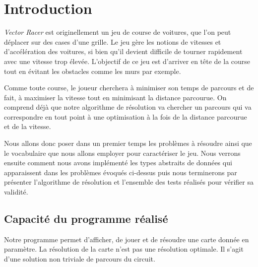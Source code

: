 \section*{Introduction}
\textit{Vector Racer} est originellement un jeu de course de voitures, que l'on peut déplacer sur des cases d'une grille. Le jeu gère les notions de vitesses et d'accélération des voitures, si bien qu'il devient difficile de tourner rapidement avec une vitesse trop élevée. L'objectif de ce jeu est d'arriver en tête de la course tout en évitant les obstacles comme les murs par exemple.

Comme toute course, le joueur cherchera à minimiser son temps de parcours et de fait, à maximiser la vitesse tout en minimisant la distance parcourue. On comprend déjà que notre algorithme de résolution va chercher un parcours qui va correspondre en tout point à une optimisation à la fois de la distance parcourue et de la vitesse.

Nous allons donc poser dans un premier temps les problèmes à résoudre ainsi que le vocabulaire que nous allons employer pour caractériser le jeu. Nous verrons ensuite comment nous avons implémenté les types abstraits de données qui apparaissent dans les problèmes évoqués ci-dessus puis nous terminerons par présenter l'algorithme de résolution et l'ensemble des tests réalisés pour vérifier sa validité.

\subsection*{Capacité du programme réalisé}

Notre programme permet d'afficher, de jouer et de résoudre une carte donnée en paramètre.
La résolution de la carte n'est pas une résolution optimale. Il s'agit d'une solution non triviale de parcours du circuit.